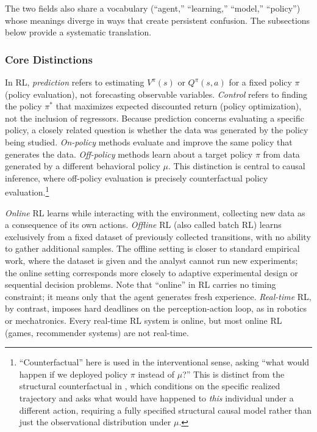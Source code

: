The two fields also share a vocabulary (``agent,'' ``learning,'' ``model,'' ``policy'') whose meanings diverge in ways that create persistent confusion. The subsections below provide a systematic translation.

\subsubsection{Core Distinctions}
\label{subsec:core_distinctions}

In RL, \textit{prediction} refers to estimating $V^\pi(s)$ or $Q^\pi(s,a)$ for a fixed policy $\pi$ (policy evaluation), not forecasting observable variables. \textit{Control} refers to finding the policy $\pi^*$ that maximizes expected discounted return (policy optimization), not the inclusion of regressors. Because prediction concerns evaluating a specific policy, a closely related question is whether the data was generated by the policy being studied. \textit{On-policy} methods evaluate and improve the same policy that generates the data. \textit{Off-policy} methods learn about a target policy $\pi$ from data generated by a different behavioral policy $\mu$. This distinction is central to causal inference, where off-policy evaluation is precisely counterfactual policy evaluation.\footnote{``Counterfactual'' here is used in the interventional sense, asking ``what would happen if we deployed policy $\pi$ instead of $\mu$?'' This is distinct from the structural counterfactual in \citet{oberst2019counterfactual}, which conditions on the specific realized trajectory and asks what would have happened to \textit{this} individual under a different action, requiring a fully specified structural causal model rather than just the observational distribution under $\mu$.}

\textit{Online} RL learns while interacting with the environment, collecting new data as a consequence of its own actions. \textit{Offline} RL (also called batch RL) learns exclusively from a fixed dataset of previously collected transitions, with no ability to gather additional samples. The offline setting is closer to standard empirical work, where the dataset is given and the analyst cannot run new experiments; the online setting corresponds more closely to adaptive experimental design or sequential decision problems. Note that ``online'' in RL carries no timing constraint; it means only that the agent generates fresh experience. \textit{Real-time} RL, by contrast, imposes hard deadlines on the perception-action loop, as in robotics or mechatronics. Every real-time RL system is online, but most online RL (games, recommender systems) are not real-time.

